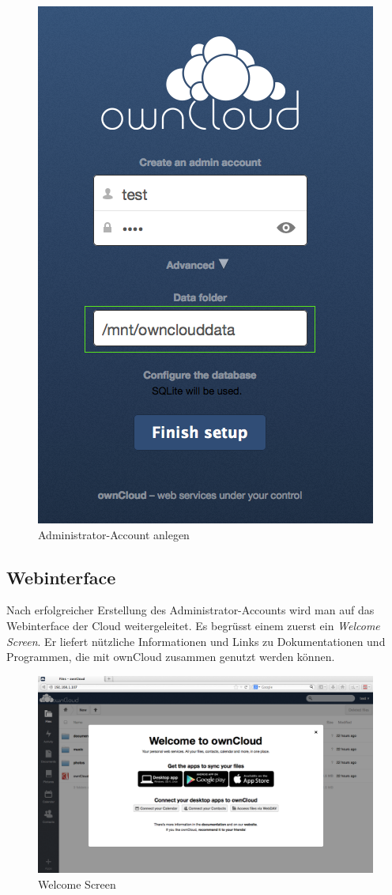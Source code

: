 \begin{figure}[H]
\centering
\includegraphics[scale=0.5]{images/admin_setup}
\caption{Administrator-Account anlegen}
\end{figure}

\subsection{Webinterface}
Nach erfolgreicher Erstellung des Administrator-Accounts wird man auf das Webinterface der Cloud weitergeleitet. Es begrüsst einem zuerst ein \textit{Welcome Screen}. Er liefert nützliche Informationen und Links zu Dokumentationen und Programmen, die mit ownCloud zusammen genutzt werden können.

\begin{figure}[H]
\centering
\includegraphics[scale=0.4]{images/welcomescreen}
\caption{Welcome Screen}
\end{figure}

